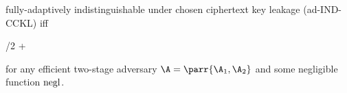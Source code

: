 \begin{definition}
\begin{sitemize}
        \item fully-adaptively indistinguishable under chosen ciphertext key leakage (ad-IND-CCKL) iff
        \begin{bralign}
            /2 + \varepsilon\parr{\secpar}
        \end{bralign}
    \end{sitemize}
    for any efficient two-stage adversary \(\A = \parr{\A_1, \A_2}\) and some negligible function \(\operatorname{negl}\).
\end{definition}